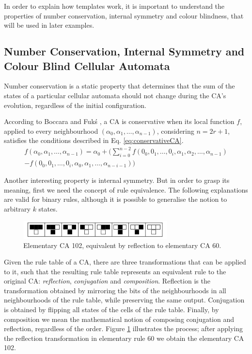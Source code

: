\documentclass{llncs}
\begin{document}
In order to explain how templates work, it is important to understand the properties of number conservation, internal symmetry and colour blindness, that will be used in later examples.

\subsection{Number Conservation, Internal Symmetry and Colour Blind Cellular Automata}
Number conservation is a static property that determines that the sum of the states of a particular cellular automata should not change during the CA's evolution, regardless of the initial configuration.

According to Boccara and Fukś \cite{boccara2002}, a CA is conservative when its local function $f$, applied to every neighbourhood $(\alpha_0,\alpha_1, \dots, \alpha_{n-1})$, considering $n=2r+1$, satisfies the conditions described in Eq. \ref{eq:conservativeCA}.
\begin{equation}
\begin{split}
f(\alpha_0,\alpha_1, \dots,\alpha_{n-1}) = \alpha_0 + (\sum_{i=0}^{n-2}f(0_0,0_1, \dots,0_i,\alpha_1,\alpha_2, \dots,\alpha_{n-1}) \\- f(0_0,0_1, \dots,0_i,\alpha_0,\alpha_1, \dots,\alpha_{n-i-1}))
\label{eq:conservativeCA}
\end{split}
\end{equation}

Another interesting property is internal symmetry. But in order to grasp its meaning, first we need the concept of rule equivalence. The following explanations are valid for binary rules, although it is possible to generalise the notion to arbitrary $k$ states.
  \begin{figure}
    \centering
    \includegraphics[width=0.7\textwidth]{fig_ruleIcon102.png}
    \caption{Elementary CA 102, equivalent by reflection to elementary CA 60.}
    \label{fig:table102}
  \end{figure}
  
Given the rule table of a CA, there are three transformations that can be applied to it, such that the resulting rule table represents an equivalent rule to the original CA: \textit{reflection}, \textit{conjugation} and \textit{composition}. Reflection is the transformation obtained by mirroring the bits of the neighbourhoods in all neighbourhoods of the rule table, while preserving the same output. Conjugation is obtained by flipping all states of the cells of the rule table. Finally, by composition we mean the mathematical notion of composing conjugation and reflection, regardless of the order. Figure \ref{fig:table102} illustrates the process; after applying the reflection transformation in elementary rule 60 we obtain the elementary CA 102.
\end{document}

